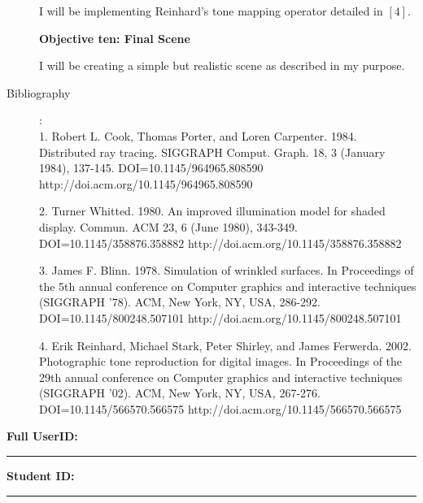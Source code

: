 \documentclass {article}
\begin{document}
\begin{description}
I will be implementing Reinhard's tone mapping operator detailed in $[4]$.

{\bf Objective ten: Final Scene}

I will be creating a simple but realistic scene as described in my purpose.

\item[Bibliography]:\\
1. Robert L. Cook, Thomas Porter, and Loren Carpenter. 1984. Distributed ray tracing. SIGGRAPH Comput. Graph. 18, 3 (January 1984), 137-145. DOI=10.1145/964965.808590 http://doi.acm.org/10.1145/964965.808590

2. Turner Whitted. 1980. An improved illumination model for shaded display. Commun. ACM 23, 6 (June 1980), 343-349. DOI=10.1145/358876.358882 http://doi.acm.org/10.1145/358876.358882

3. James F. Blinn. 1978. Simulation of wrinkled surfaces. In Proceedings of the 5th annual conference on Computer graphics and interactive techniques (SIGGRAPH '78). ACM, New York, NY, USA, 286-292. DOI=10.1145/800248.507101 http://doi.acm.org/10.1145/800248.507101

4. Erik Reinhard, Michael Stark, Peter Shirley, and James Ferwerda. 2002. Photographic tone reproduction for digital images. In Proceedings of the 29th annual conference on Computer graphics and interactive techniques (SIGGRAPH '02). ACM, New York, NY, USA, 267-276. DOI=10.1145/566570.566575 http://doi.acm.org/10.1145/566570.566575

\end{description}
\newpage



{\hfill{\bf Full UserID:\rule{2in}{.1mm}}\hfill{\bf Student ID:\rule{2in}{.1mm}}\hfill}
\end{document}
